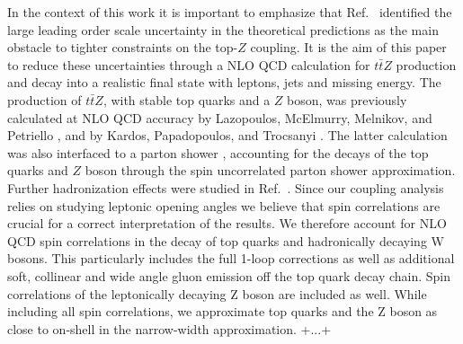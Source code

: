 \documentclass[preprint]{JHEP3} %
\def\Dphill{\Delta \phi_{ll}}
\def\ttbZ{t\bar{t}Z}
\def\ptZ{p_{t,Z}}
\begin{document}
In the context of this work it is important to emphasize that Ref.~\cite{Baur:2004uw} identified the large leading order scale uncertainty in the theoretical predictions 
as the main obstacle to tighter constraints on the top-$Z$ coupling.
It is the aim of this paper to reduce these uncertainties through a NLO QCD calculation for $\ttbZ$ production and decay into a realistic final state with leptons, jets and missing energy.
The production of $\ttbZ$, with stable top quarks and a $Z$ boson, was previously calculated at NLO QCD accuracy by Lazopoulos, McElmurry, Melnikov, and Petriello \cite{Lazopoulos:2008de}, and  by Kardos, Papadopoulos, and Trocsanyi \cite{Kardos:2011na}.
The latter calculation was also interfaced to a parton shower \cite{Garzelli:2011is}, accounting for the decays of the top quarks and $Z$ boson through the spin uncorrelated parton shower approximation.
Further hadronization effects were studied in Ref.~\cite{Garzelli:2012bn}.
Since our coupling analysis relies on studying leptonic opening angles we believe that spin correlations are crucial for a correct interpretation of the results.
We therefore account for NLO QCD spin correlations in the decay of top quarks and hadronically decaying W bosons.
This particularly includes the full 1-loop corrections as well as additional soft, collinear and wide angle gluon emission off the top quark decay chain.
Spin correlations of the leptonically decaying Z boson are included as well.
While including all spin correlations, we approximate top quarks and the Z boson as close to on-shell in the narrow-width approximation. +...+
\end{document}
